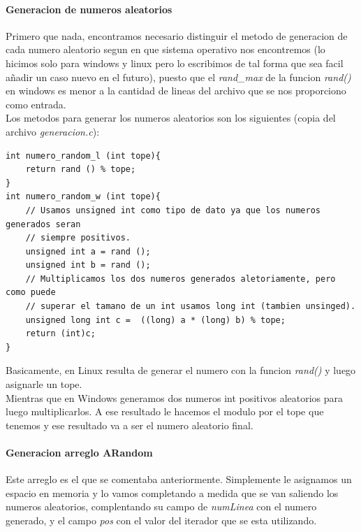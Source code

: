 \documentclass{article}
\begin{document}
	\paragraph{Generacion de numeros aleatorios}
	Primero que nada, encontramos necesario distinguir el metodo de generacion de cada numero aleatorio segun en que sistema operativo nos encontremos (lo hicimos solo para windows y linux pero  lo escribimos de tal forma que sea facil añadir un caso nuevo en el futuro), puesto que el \emph{rand\_max} de la funcion \emph{rand()} en windows es menor a la cantidad de lineas del archivo que se nos proporciono como entrada.
	\\
	Los metodos para generar los numeros aleatorios son los siguientes (copia del archivo \emph{generacion.c}):
	\begin{lstlisting}[style=CStyle]
int numero_random_l (int tope){
	return rand () % tope;
}
int numero_random_w (int tope){
	// Usamos unsigned int como tipo de dato ya que los numeros generados seran
	// siempre positivos.
	unsigned int a = rand ();
	unsigned int b = rand ();
	// Multiplicamos los dos numeros generados aletoriamente, pero como puede
	// superar el tamano de un int usamos long int (tambien unsinged).
	unsigned long int c =  ((long) a * (long) b) % tope;
	return (int)c;
}
	\end{lstlisting}
	
	Basicamente, en Linux resulta de generar el numero con la funcion \emph{rand()} y luego asignarle un tope. \\Mientras que en Windows generamos dos numeros int positivos aleatorios para luego multiplicarlos. A ese resultado le hacemos el modulo por el tope que tenemos y ese resultado va a ser el numero aleatorio final.
	
	\paragraph{Generacion arreglo ARandom}
	Este arreglo es el que se comentaba anteriormente. Simplemente le asignamos un espacio en memoria y lo vamos completando a medida que se van saliendo los numeros aleatorios, complentando su campo de \emph{numLinea} con el numero generado, y el campo \emph{pos} con el valor del iterador que se esta utilizando.
	
\end{document}
